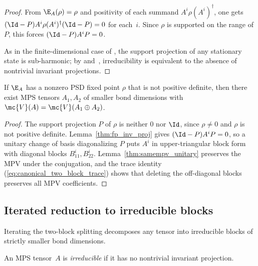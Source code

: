 \begin{proof}
    \leanok
    From $\E_A(\rho)=\rho$ and positivity of each summand
    $A^i\rho(A^i)^\dagger$, one gets
    $(\Id-P)A^i\rho(A^i)^\dagger(\Id-P)=0$ for each~$i$.
    Since $\rho$ is supported on the range of $P$, this forces
    $(\Id-P)A^iP=0$.

    As in the finite-dimensional case of
    \cite[Proposition~6.10]{Wolf2012Quantum}, the support projection of any
    stationary state is sub-harmonic; by
    \cite[Theorem~6.2]{Wolf2012Quantum} and~\cite[Section~IV.A.1]{Cirac2021Matrix},
    irreducibility is equivalent to the absence of nontrivial invariant
    projections.
\end{proof}

\begin{lemma}\label{thm:two_block_decomp}
    \leanok
    If $\E_A$ has a nonzero PSD fixed point $\rho$ that is not positive definite,
    then there exist MPS tensors $A_1,A_2$ of smaller bond dimensions with
    $\mc{V}(A)=\mc{V}(A_1\oplus A_2)$.
\end{lemma}

\begin{proof}
    \leanok
    The support projection $P$ of $\rho$ is neither $0$ nor $\Id$, since
    $\rho\neq0$ and $\rho$ is not positive definite.
    Lemma~\ref{thm:fp_inv_proj} gives $(\Id-P)A^iP=0$, so a unitary
    change of basis diagonalizing $P$ puts $A^i$ in upper-triangular block
    form with diagonal blocks $B_{11}^i,B_{22}^i$.
    Lemma~\ref{thm:samempv_unitary} preserves the MPV under the conjugation,
    and the trace identity (\ref{eq:canonical_two_block_trace}) shows that
    deleting the off-diagonal blocks preserves all MPV coefficients.
\end{proof}

\subsection{Iterated reduction to irreducible blocks}

Iterating the two-block splitting decomposes any tensor into irreducible blocks
of strictly smaller bond dimensions.

\begin{definition}\label{def:irreducible_tensor}
    \leanok
    An MPS tensor~$A$ is \emph{irreducible} if it has no nontrivial invariant
    projection.
\end{definition}

